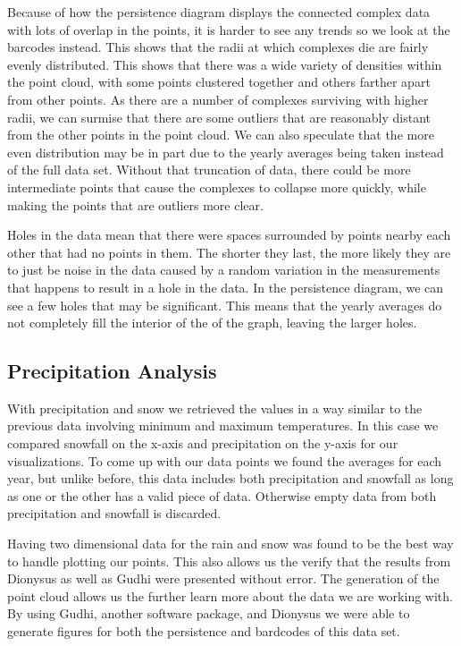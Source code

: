 \documentclass[12pt]{report}
\begin{document}
Because of how the persistence diagram displays the connected complex data with lots of overlap in the points, it is harder to see any trends so we look at the barcodes instead. This shows that the radii at which complexes die are fairly evenly distributed. This shows that there was a wide variety of densities within the point cloud, with some points clustered together and others farther apart from other points. As there are a number of complexes surviving with higher radii, we can surmise that there are some outliers that are reasonably distant from the other points in the point cloud. We can also speculate that the more even distribution may be in part due to the yearly averages being taken instead of the full data set. Without that truncation of data, there could be more intermediate points that cause the complexes to collapse more quickly, while making the points that are outliers more clear. 

Holes in the data mean that there were spaces surrounded by points nearby each other that had no points in them. The shorter they last, the more likely they are to just be noise in the data caused by a random variation in the measurements that happens to result in a hole in the data. In the persistence diagram, we can see a few holes that may be significant. This means that the yearly averages do not completely fill the interior of the of the graph, leaving the larger holes.







\clearpage
\subsection*{Precipitation Analysis}
With precipitation and snow we retrieved the values in a way similar to the previous data involving minimum and maximum temperatures. In this case we compared snowfall on the x-axis and precipitation on the y-axis for our visualizations. To come up with our data points we found the averages for each year, but unlike before, this data includes both precipitation and snowfall as long as one or the other has a valid piece of data. Otherwise empty data from both precipitation and snowfall is discarded.\par 

Having two dimensional data for the rain and snow was found to be the best way to handle plotting our points. This also allows us the verify that the results from Dionysus as well as Gudhi were presented without error. The generation of the point cloud allows us the further learn more about the data we are working with. By using Gudhi, another software package, and Dionysus we were able to generate figures for both the persistence and bardcodes of this data set.\par
\end{document}
